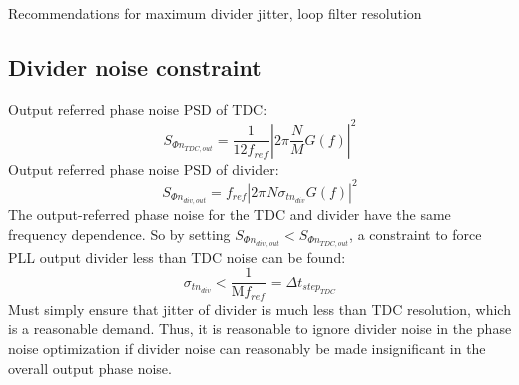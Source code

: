 	Recommendations for maximum divider jitter, loop filter resolution
	\subsection{Divider noise constraint}
		Output referred phase noise PSD of TDC:
		\begin{equation}
			S_{\Phi n_{TDC,out}} = \frac{1}{12 f_{ref}}\left|2\pi\frac{N}{M} G(f) \right|^2
		\end{equation}
		Output referred phase noise PSD of divider:
		\begin{equation}
			S_{\Phi n_{div, out}} = f_{ref} \left|2\pi N \sigma_{tn_{div}} G(f)\right|^2
		\end{equation}
		The output-referred phase noise for the TDC and divider have the same frequency dependence. So by setting $S_{\Phi n_{div, out}} < S_{\Phi n_{TDC,out}}$, a constraint to force PLL output divider less than TDC noise can be found:
		\begin{equation}
			\sigma_{tn_{div}} < \frac{1}{\mathrm{M}f_{ref}} = \Delta t_{step_{TDC}}
		\end{equation}
		Must simply ensure that jitter of divider is much less than TDC resolution, which is a reasonable demand. Thus, it is reasonable to ignore divider noise in the phase noise optimization if divider noise can reasonably be made insignificant in the overall output phase noise.




\FloatBarrier
